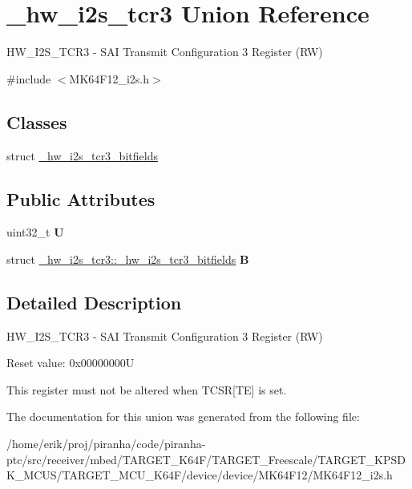 \hypertarget{union__hw__i2s__tcr3}{}\section{\+\_\+hw\+\_\+i2s\+\_\+tcr3 Union Reference}
\label{union__hw__i2s__tcr3}


H\+W\+\_\+\+I2\+S\+\_\+\+T\+C\+R3 -\/ S\+AI Transmit Configuration 3 Register (RW)  




{\ttfamily \#include $<$M\+K64\+F12\+\_\+i2s.\+h$>$}

\subsection*{Classes}
\begin{DoxyCompactItemize}
\item 
struct \hyperlink{struct__hw__i2s__tcr3_1_1__hw__i2s__tcr3__bitfields}{\+\_\+hw\+\_\+i2s\+\_\+tcr3\+\_\+bitfields}
\end{DoxyCompactItemize}
\subsection*{Public Attributes}
\begin{DoxyCompactItemize}
\item 
uint32\+\_\+t {\bfseries U}\hypertarget{union__hw__i2s__tcr3_a30514547e24a6bce46ba9e4fbf7bfca0}{}\label{union__hw__i2s__tcr3_a30514547e24a6bce46ba9e4fbf7bfca0}

\item 
struct \hyperlink{struct__hw__i2s__tcr3_1_1__hw__i2s__tcr3__bitfields}{\+\_\+hw\+\_\+i2s\+\_\+tcr3\+::\+\_\+hw\+\_\+i2s\+\_\+tcr3\+\_\+bitfields} {\bfseries B}\hypertarget{union__hw__i2s__tcr3_aa24c7549753deb8321ad32ce32d33530}{}\label{union__hw__i2s__tcr3_aa24c7549753deb8321ad32ce32d33530}

\end{DoxyCompactItemize}


\subsection{Detailed Description}
H\+W\+\_\+\+I2\+S\+\_\+\+T\+C\+R3 -\/ S\+AI Transmit Configuration 3 Register (RW) 

Reset value\+: 0x00000000U

This register must not be altered when T\+C\+SR\mbox{[}TE\mbox{]} is set. 

The documentation for this union was generated from the following file\+:\begin{DoxyCompactItemize}
\item 
/home/erik/proj/piranha/code/piranha-\/ptc/src/receiver/mbed/\+T\+A\+R\+G\+E\+T\+\_\+\+K64\+F/\+T\+A\+R\+G\+E\+T\+\_\+\+Freescale/\+T\+A\+R\+G\+E\+T\+\_\+\+K\+P\+S\+D\+K\+\_\+\+M\+C\+U\+S/\+T\+A\+R\+G\+E\+T\+\_\+\+M\+C\+U\+\_\+\+K64\+F/device/device/\+M\+K64\+F12/M\+K64\+F12\+\_\+i2s.\+h\end{DoxyCompactItemize}

